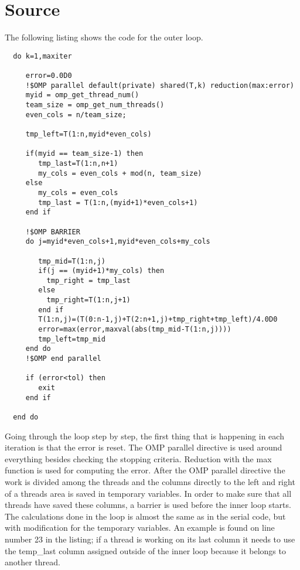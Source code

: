 \documentclass[a4paper, 12pt]{article}
\begin{document}
\newpage

\section{Source}
\label{sec:src}
The following listing shows the code for the outer loop.

\begin{lstlisting}
  do k=1,maxiter
     
     error=0.0D0
     !$OMP parallel default(private) shared(T,k) reduction(max:error)
     myid = omp_get_thread_num()
     team_size = omp_get_num_threads()
     even_cols = n/team_size;

     tmp_left=T(1:n,myid*even_cols)

     if(myid == team_size-1) then
        tmp_last=T(1:n,n+1)
        my_cols = even_cols + mod(n, team_size)
     else 
        my_cols = even_cols
        tmp_last = T(1:n,(myid+1)*even_cols+1)
     end if

     !$OMP BARRIER
     do j=myid*even_cols+1,myid*even_cols+my_cols

        tmp_mid=T(1:n,j)
        if(j == (myid+1)*my_cols) then
          tmp_right = tmp_last
        else
          tmp_right=T(1:n,j+1)
        end if
        T(1:n,j)=(T(0:n-1,j)+T(2:n+1,j)+tmp_right+tmp_left)/4.0D0
        error=max(error,maxval(abs(tmp_mid-T(1:n,j))))
        tmp_left=tmp_mid
     end do
     !$OMP end parallel
     
     if (error<tol) then
        exit
     end if
     
  end do
\end{lstlisting}


Going through the loop step by step, the first thing that is happening in each
iteration is that the error is reset. The OMP parallel directive is used around
everything besides checking the stopping criteria. Reduction with the max
function is used for computing the error. After the OMP parallel directive the
work is divided among the threads and the columns directly to the left and right
of a threads area is saved in temporary variables. In order to make sure that
all threads have saved these columns, a barrier is used before the inner loop
starts. The calculations done in the loop is almost the same as in the serial
code, but with modification for the temporary variables. An example is found on
line number 23 in the listing; if a thread is working on its
last column it needs to use the temp\_last column assigned outside of the inner
loop because it belongs to another thread. 

\end{document}
